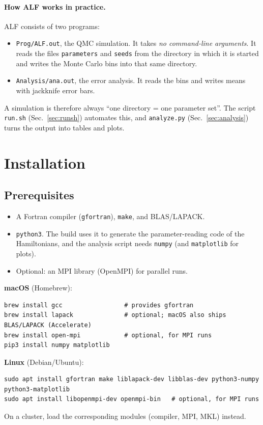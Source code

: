 \documentclass[11pt,a4paper]{article}
\newcommand{\f}[1]{\texttt{#1}}          %
\begin{document}
\paragraph{How ALF works in practice.}
ALF consists of two programs:
\begin{itemize}
  \item \f{Prog/ALF.out}, the QMC simulation. It takes \emph{no command-line arguments}. It
        reads the files \f{parameters} and \f{seeds} from the directory in which it is started
        and writes the Monte Carlo bins into that same directory.
  \item \f{Analysis/ana.out}, the error analysis. It reads the bins and writes means with
        jackknife error bars.
\end{itemize}
A simulation is therefore always ``one directory = one parameter set''. The script
\f{run.sh} (Sec.~\ref{sec:runsh}) automates this, and \f{analyze.py}
(Sec.~\ref{sec:analysis}) turns the output into tables and plots.

\section{Installation}

\subsection{Prerequisites}
\begin{itemize}
  \item A Fortran compiler (\f{gfortran}), \f{make}, and BLAS/LAPACK.
  \item \f{python3}. The build uses it to generate the parameter-reading code of the
        Hamiltonians, and the analysis script needs \f{numpy} (and \f{matplotlib} for plots).
  \item Optional: an MPI library (OpenMPI) for parallel runs.
\end{itemize}

\textbf{macOS} (Homebrew):
\begin{lstlisting}
brew install gcc                 # provides gfortran
brew install lapack              # optional; macOS also ships BLAS/LAPACK (Accelerate)
brew install open-mpi            # optional, for MPI runs
pip3 install numpy matplotlib
\end{lstlisting}
\textbf{Linux} (Debian/Ubuntu):
\begin{lstlisting}
sudo apt install gfortran make liblapack-dev libblas-dev python3-numpy python3-matplotlib
sudo apt install libopenmpi-dev openmpi-bin   # optional, for MPI runs
\end{lstlisting}
On a cluster, load the corresponding modules (compiler, MPI, MKL) instead.
\end{document}

